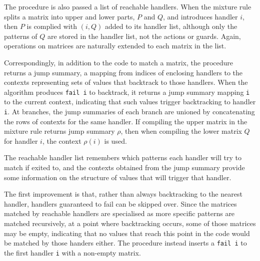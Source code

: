 The procedure is also passed a list of reachable handlers. When the mixture rule splits a matrix into upper and lower parts, $P$ and $Q$, and introduces handler $i$, then $P$ is complied with $(i, Q)$ added to its handler list, although only the patterns of $Q$ are stored in the handler list, not the actions or guards. Again, operations on matrices are naturally extended to each matrix in the list. 

Correspondingly, in addition to the code to match a matrix, the procedure returns a jump summary, a mapping from indices of enclosing handlers to the contexts representing sets of values that backtrack to those handlers.
 When the algorithm produces \verb|fail i| to backtrack, it returns a jump summary mapping \verb|i| to the current context, indicating that such values trigger backtracking to handler \verb|i|. At branches, the jump summaries of each branch are unioned by concatenating the rows of contexts for the same handler. %
%
If compiling the upper matrix in the mixture rule returns jump summary $\rho$, then when compiling the lower matrix $Q$ for handler $i$, the context $\rho(i)$ is used.%


The reachable handler list remembers which patterns each handler will try to match if exited to, and the contexts obtained from the jump summary provide some information on the structure of values that will trigger that handler. 

The first improvement is that, rather than always backtracking to the nearest handler, handlers guaranteed to fail can be skipped over. Since the matrices matched by reachable handlers are specialised as more specific patterns are matched recursively, at a point where backtracking occurs, some of those matrices may be empty, indicating that no values that reach this point in the code would be matched by those handers either.
The procedure instead inserts a \verb|fail i| to the first handler \verb|i| with a non-empty matrix. %

